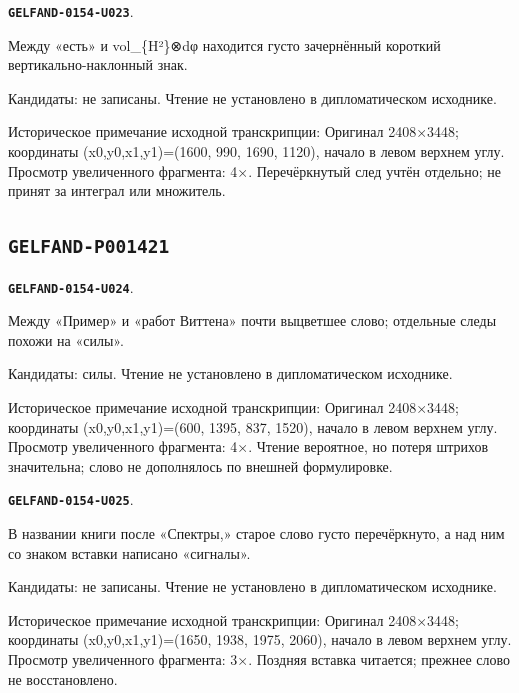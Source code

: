 \documentclass[11pt]{article}
\theoremstyle{definition}
\theoremstyle{remark}
\begin{document}
\par\noindent\leavevmode{}\label{GELFAND-0154-U023}\label{GELFAND-P001420:invariant-volume-cancelled:note}\textbf{\texttt{GELFAND-0154-U023}}.\nopagebreak[4]\par
Между «есть» и vol\_\{H²\}⊗dφ находится густо зачернённый короткий вертикально-наклонный знак.\par
Кандидаты: не записаны. Чтение не установлено в дипломатическом исходнике.\par
Историческое примечание исходной транскрипции: Оригинал 2408×3448; координаты (x0,y0,x1,y1)=(1600, 990, 1690, 1120), начало в левом верхнем углу. Просмотр увеличенного фрагмента: 4×. Перечёркнутый след учтён отдельно; не принят за интеграл или множитель.\par\medskip
\subsection*{\texttt{GELFAND-P001421}}
\par\noindent\leavevmode{}\label{GELFAND-0154-U024}\label{GELFAND-P001421:witten-heading-faint-word:note}\textbf{\texttt{GELFAND-0154-U024}}.\nopagebreak[4]\par
Между «Пример» и «работ Виттена» почти выцветшее слово; отдельные следы похожи на «силы».\par
Кандидаты: силы. Чтение не установлено в дипломатическом исходнике.\par
Историческое примечание исходной транскрипции: Оригинал 2408×3448; координаты (x0,y0,x1,y1)=(600, 1395, 837, 1520), начало в левом верхнем углу. Просмотр увеличенного фрагмента: 4×. Чтение вероятное, но потеря штрихов значительна; слово не дополнялось по внешней формулировке.\par\medskip
\par\noindent\leavevmode{}\label{GELFAND-0154-U025}\label{GELFAND-P001421:book-title-cancelled:note}\textbf{\texttt{GELFAND-0154-U025}}.\nopagebreak[4]\par
В названии книги после «Спектры,» старое слово густо перечёркнуто, а над ним со знаком вставки написано «сигналы».\par
Кандидаты: не записаны. Чтение не установлено в дипломатическом исходнике.\par
Историческое примечание исходной транскрипции: Оригинал 2408×3448; координаты (x0,y0,x1,y1)=(1650, 1938, 1975, 2060), начало в левом верхнем углу. Просмотр увеличенного фрагмента: 3×. Поздняя вставка читается; прежнее слово не восстановлено.\par\medskip
\end{document}
